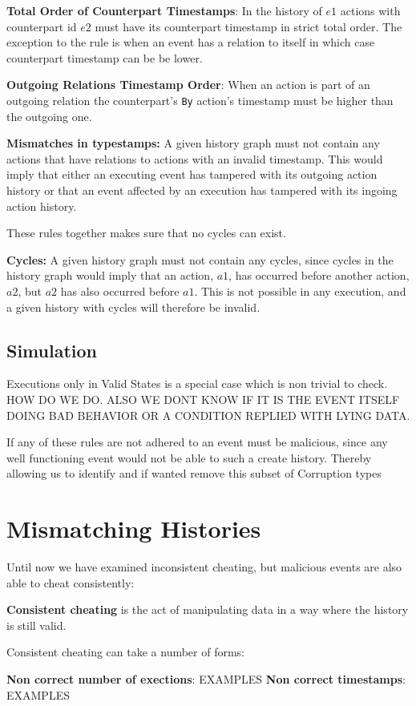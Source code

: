 	\newpar \textbf{Total Order of Counterpart Timestamps}: In the history of $e1$ actions with counterpart id $e2$ must have its counterpart timestamp in strict total order.  The exception to the rule is when an event has a relation to itself in which case counterpart timestamp can be be lower. 
	
	\newpar \textbf{Outgoing Relations Timestamp Order}: When an action is part of an outgoing relation the counterpart's \texttt{By} action's timestamp must be higher than the outgoing one. 
	
	\newpar \textbf{Mismatches in typestamps:} A given history graph must not contain any actions that have relations to actions with an invalid timestamp. This would imply that either an executing event has tampered with its outgoing action history or that an event affected by an execution has tampered with its ingoing action history. 
	
	\newpar These rules together makes sure that no cycles can exist.
	
	\textbf{Cycles:} A given history graph must not contain any cycles, since cycles in the history graph would imply that an action, $a1$, has occurred before another action, $a2$, but $a2$ has also occurred before $a1$. This is not possible in any execution, and a given history with cycles will therefore be invalid.
	
	
	
	
	
	\subsection{Simulation}
	Executions only in Valid States is a special case which is non trivial to check. HOW DO WE DO. ALSO WE DONT KNOW IF IT IS THE EVENT ITSELF DOING BAD BEHAVIOR OR A CONDITION REPLIED WITH LYING DATA.
	
	\newpar If any of these rules are not adhered to an event must be malicious, since any well functioning event would not be able to such a create history. Thereby allowing us to identify and if wanted remove this subset of Corruption types 
	
	\section{Mismatching Histories}
	Until now we have examined inconsistent cheating, but malicious events are also able to cheat consistently:
	\begin{definition}
		\textbf{Consistent cheating} is the act of manipulating data in a way where the history is still valid.
	\end{definition}
	
	\newpar Consistent cheating can take a number of forms:
	
	\newpar \textbf{Non correct number of exections}: EXAMPLES
	\newpar \textbf{Non correct timestamps}: EXAMPLES
